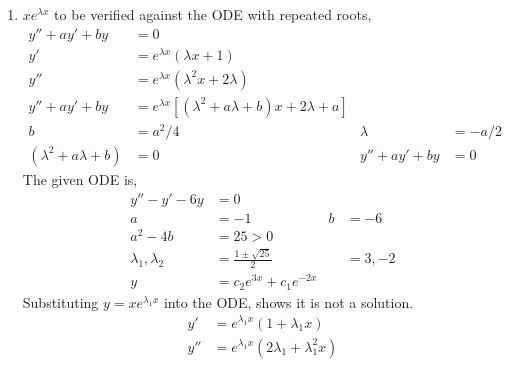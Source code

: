 \begin{enumerate}
\begin{enumerate}
              \item $ xe^{\lambda x} $ to be verified against the ODE with repeated roots,
                    \begin{align}
                        y'' + ay' + by                & = 0                                                                                                    \\
                        y'                            & = e^{\lambda x} (\lambda x + 1)                                                                        \\
                        y''                           & = e^{\lambda x}(\lambda ^{2}x + 2\lambda)                                                              \\
                        y'' + ay' + by                & = e^{\lambda x} \left[ (\lambda ^{2} + a\lambda + b)x + 2\lambda + a \right]                           \\
                        b                             & = a^{2}/4                                                                    & \lambda        & = -a/2 \\
                        (\lambda ^{2} + a\lambda + b) & = 0                                                                          & y'' + ay' + by & = 0
                    \end{align}
                    The given ODE is,
                    \begin{align}
                        y'' - y' - 6y            & = 0                                        \\
                        a                        & = -1                         & b & = -6    \\
                        a^{2} - 4b               & = 25 > 0                                   \\
                        \lambda_{1}, \lambda_{2} & = \frac{1 \pm \sqrt{25}}{2}  &   & = 3, -2 \\
                        y                        & = c_{2}e^{3x} + c_{1}e^{-2x}
                    \end{align}
                    Substituting $y = xe^{\lambda_{1}x}$ into the ODE, shows it is not a solution.
                    \begin{align}
                        y'          & = e^{\lambda_{1}x}(1 + \lambda_{1}x)                                                     \\
                        y''         & = e^{\lambda_{1}x}(2\lambda_{1} + \lambda_{1}^{2}x)                                      \\

\end{align}
\end{enumerate}
\end{enumerate}
